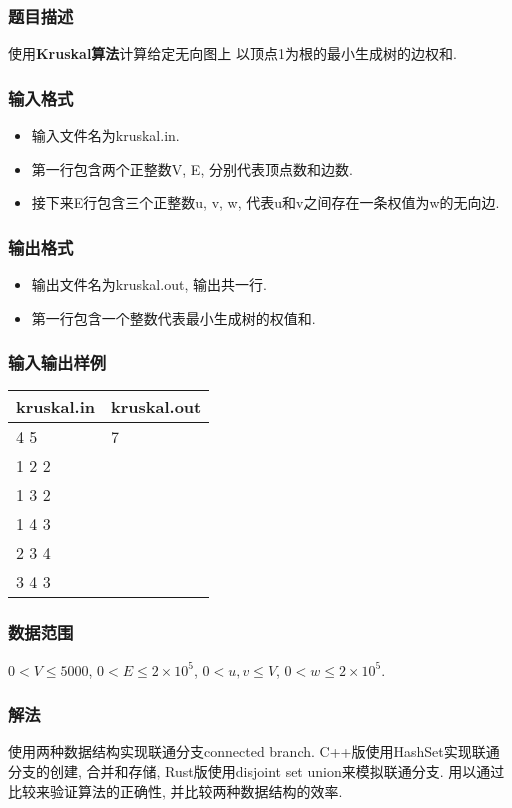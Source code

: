 \subsubsection{题目描述}
使用\textbf{Kruskal算法}计算给定无向图上  以顶点1为根的最小生成树的边权和.
\subsubsection{输入格式}
\begin{itemize}
	\item 输入文件名为kruskal.in.
	\item 第一行包含两个正整数V, E, 分别代表顶点数和边数.
	\item 接下来E行包含三个正整数u, v, w, 代表u和v之间存在一条权值为w的无向边.
\end{itemize}

\subsubsection{输出格式}
\begin{itemize}
	\item 输出文件名为kruskal.out, 输出共一行.
	\item 第一行包含一个整数代表最小生成树的权值和.
\end{itemize}

\subsubsection{输入输出样例}
\label{sec:iosample}
\begin{table}[h!]
	\centering
	\begin{tabular}{|l|l|}
		\hline
		kruskal.in & kruskal.out \\
		\hline
		4 5        & 7           \\
		1 2 2      & ~           \\
		1 3 2      & ~           \\
		1 4 3      & ~           \\
		2 3 4      & ~           \\
		3 4 3      & ~           \\
		\hline
	\end{tabular}
\end{table}

\subsubsection{数据范围}
$0 < V \leq 5000$,
$0 < E \leq 2\times 10^5$,
$0 < u,v \leq V$,
$0 < w \leq 2\times 10^5$.

\subsubsection{解法}
使用两种数据结构实现联通分支connected branch.
C++版使用HashSet实现联通分支的创建, 合并和存储,
Rust版使用disjoint set union来模拟联通分支. 用以通过比较来验证算法的正确性,
并比较两种数据结构的效率.

